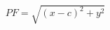 \documentclass[preview]{standalone}
\begin{document}
\begin{align*}
PF = \sqrt{(x-c)^2+y^2}
\end{align*}
\end{document}
